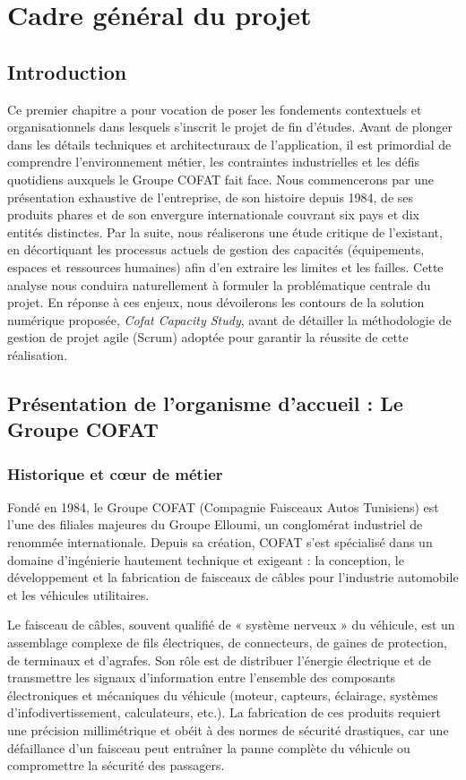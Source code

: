 \chapter{Cadre général du projet}
\label{chap:cadre_general}

\section{Introduction}
Ce premier chapitre a pour vocation de poser les fondements contextuels et organisationnels dans lesquels s'inscrit le projet de fin d'études. Avant de plonger dans les détails techniques et architecturaux de l'application, il est primordial de comprendre l'environnement métier, les contraintes industrielles et les défis quotidiens auxquels le Groupe COFAT fait face. Nous commencerons par une présentation exhaustive de l'entreprise, de son histoire depuis 1984, de ses produits phares et de son envergure internationale couvrant six pays et dix entités distinctes. Par la suite, nous réaliserons une étude critique de l'existant, en décortiquant les processus actuels de gestion des capacités (équipements, espaces et ressources humaines) afin d'en extraire les limites et les failles. Cette analyse nous conduira naturellement à formuler la problématique centrale du projet. En réponse à ces enjeux, nous dévoilerons les contours de la solution numérique proposée, \textit{Cofat Capacity Study}, avant de détailler la méthodologie de gestion de projet agile (Scrum) adoptée pour garantir la réussite de cette réalisation.

\section{Présentation de l'organisme d'accueil : Le Groupe COFAT}

\subsection{Historique et cœur de métier}
Fondé en 1984, le Groupe COFAT (Compagnie Faisceaux Autos Tunisiens) est l'une des filiales majeures du Groupe Elloumi, un conglomérat industriel de renommée internationale. Depuis sa création, COFAT s'est spécialisé dans un domaine d'ingénierie hautement technique et exigeant : la conception, le développement et la fabrication de faisceaux de câbles pour l'industrie automobile et les véhicules utilitaires. 

Le faisceau de câbles, souvent qualifié de « système nerveux » du véhicule, est un assemblage complexe de fils électriques, de connecteurs, de gaines de protection, de terminaux et d'agrafes. Son rôle est de distribuer l'énergie électrique et de transmettre les signaux d'information entre l'ensemble des composants électroniques et mécaniques du véhicule (moteur, capteurs, éclairage, systèmes d'infodivertissement, calculateurs, etc.). La fabrication de ces produits requiert une précision millimétrique et obéit à des normes de sécurité drastiques, car une défaillance d'un faisceau peut entraîner la panne complète du véhicule ou compromettre la sécurité des passagers.

